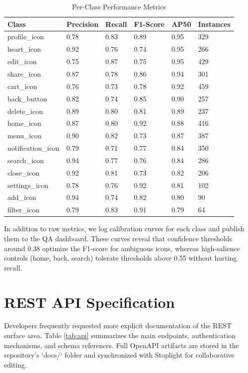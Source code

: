 \documentclass[11pt,a4paper]{report}
\begin{document}
\begin{table}[H]
\centering
\caption{Per-Class Performance Metrics}
\label{tab:classstats}
\begin{tabular}{llllll}
    \toprule
    \textbf{Class} & \textbf{Precision} & \textbf{Recall} & \textbf{F1-Score} & \textbf{AP50} & \textbf{Instances} \\ \midrule
    profile\_icon & 0.78 & 0.83 & 0.89 & 0.95 & 329 \\
    heart\_icon & 0.92 & 0.76 & 0.74 & 0.95 & 266 \\
    edit\_icon & 0.75 & 0.87 & 0.75 & 0.95 & 429 \\
    share\_icon & 0.87 & 0.78 & 0.86 & 0.94 & 301 \\
    cart\_icon & 0.76 & 0.73 & 0.78 & 0.92 & 459 \\
    back\_button & 0.82 & 0.74 & 0.85 & 0.90 & 257 \\
    delete\_icon & 0.89 & 0.80 & 0.81 & 0.89 & 237 \\
    home\_icon & 0.87 & 0.80 & 0.92 & 0.88 & 416 \\
    menu\_icon & 0.90 & 0.82 & 0.73 & 0.87 & 387 \\
    notification\_icon & 0.79 & 0.71 & 0.77 & 0.84 & 350 \\
    search\_icon & 0.94 & 0.77 & 0.76 & 0.84 & 286 \\
    close\_icon & 0.92 & 0.81 & 0.73 & 0.82 & 206 \\
    settings\_icon & 0.78 & 0.76 & 0.92 & 0.81 & 102 \\
    add\_icon & 0.94 & 0.74 & 0.82 & 0.80 & 90 \\
    filter\_icon & 0.79 & 0.83 & 0.91 & 0.79 & 64 \\
    \bottomrule
\end{tabular}
\end{table}

In addition to raw metrics, we log calibration curves for each class and publish them to the QA dashboard. These curves reveal that confidence thresholds around 0.38 optimize the F1-score for ambiguous icons, whereas high-salience controls (home, back, search) tolerate thresholds above 0.55 without hurting recall.

\chapter{REST API Specification}
Developers frequently requested more explicit documentation of the REST surface area. Table \ref{tab:api} summarizes the main endpoints, authentication mechanisms, and schema references. Full OpenAPI artifacts are stored in the repository's `docs/` folder and synchronized with Stoplight for collaborative editing.
\end{document}
